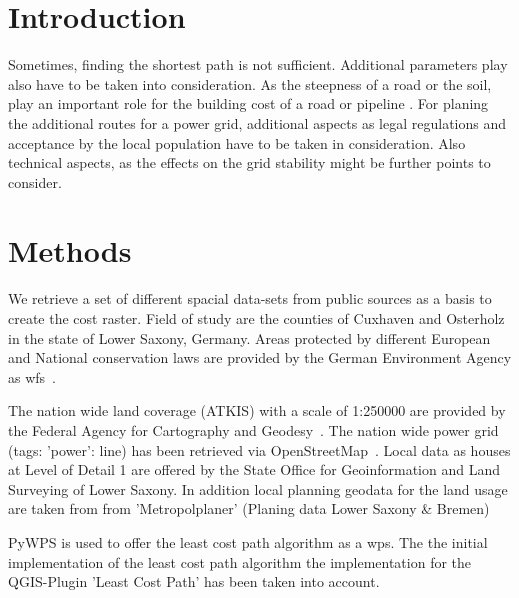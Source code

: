 \documentclass[acmtog]{acmart}
\begin{document}
	\section{Introduction}\label{sec:introduction}

	Sometimes, finding the shortest path is not sufficient.
	Additional parameters play also have to be taken into consideration.
	As the steepness of a road or the soil, play an important role for the building cost of a road or pipeline
	.
	For planing the additional routes for a power grid, additional aspects as legal regulations and acceptance
	by the local population have to be taken in consideration.
	Also technical aspects, as the effects on the grid stability might be further points to consider.\cite{schafer_understanding_2022}


	\section{Methods}\label{sec:methods}
	We retrieve a set of different spacial data-sets from  public sources as a basis to create the cost raster.
	Field of study are the counties of Cuxhaven and Osterholz in the state of Lower Saxony, Germany.
	Areas protected by different European and National conservation laws are provided by the German Environment Agency
	as \acrfull{wfs}~\cite{noauthor_schutzgebiete_2015}.

	The nation wide land coverage (ATKIS) with a scale of 1:250000 are provided by the Federal Agency for Cartography
	and Geodesy~\cite{noauthor_digitales_2021}.
	The nation wide power grid (tags: 'power': line) has been retrieved via OpenStreetMap~\cite{boeing_osmnx_2017}.
	Local data as houses at Level of Detail 1 are offered by the State Office for Geoinformation and Land Surveying of
	Lower Saxony\cite{noauthor_opengeodatani_2022}.
	In addition local planning geodata for the land usage are taken from
	from 'Metropolplaner' (Planing data Lower Saxony \& Bremen)\cite{noauthor_metropolplaner_2022}
	
	PyWPS\cite{noauthor_welcome_2016} is used to offer the least cost path algorithm as a \acrfull{wps}.
	The the initial implementation of the least cost path algorithm the implementation for the QGIS-Plugin
	'Least Cost Path'\cite{noauthor_leastcostpathdijkstra_algorithmpy_2022} has been taken into account.
	
\end{document}
